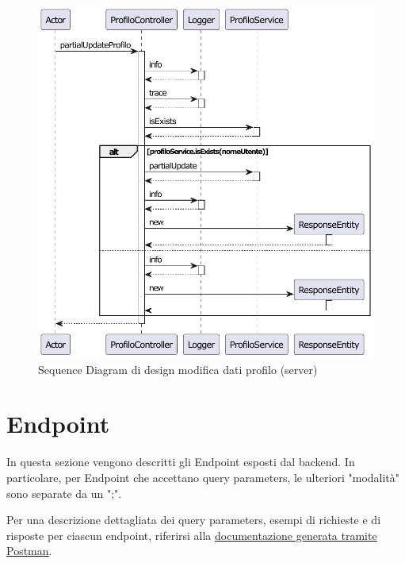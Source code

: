             \begin{figure}[htbp!]
                \centering
                    \includegraphics[width=1\linewidth]{Immagini/Diagrammi/Sequence Diagram/Design/Server Sequence Design/ServerSequenceModificaProfiloDesign.pdf}
                \caption{Sequence Diagram di design modifica dati profilo (server)}
                \label{fig:Sequence Diagram di design modifica dati profilo (server)}
            \end{figure}
    
    \clearpage

    \section{Endpoint}
        In questa sezione vengono descritti gli Endpoint esposti dal backend. In particolare, per Endpoint che accettano query parameters, le ulteriori "modalità" sono separate da un ";".

        Per una descrizione dettagliata dei query parameters, esempi di richieste e di risposte per ciascun endpoint, riferirsi alla \href{https://documenter.getpostman.com/view/37147881/2sAYBd67Sj}{\underline{documentazione generata tramite Postman}}.
    
